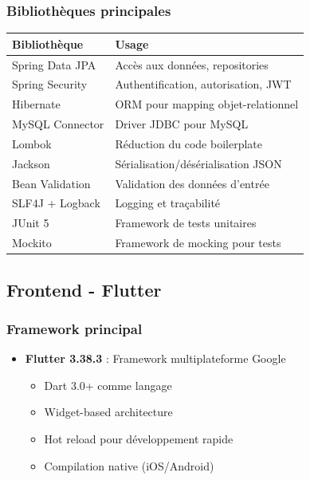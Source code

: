 \documentclass[a4paper,11pt]{report}
\begin{document}
\subsubsection{Bibliothèques principales}

\begin{longtable}{|p{}|p{}|}
    \hline
    \textbf{Bibliothèque} & \textbf{Usage} \\ \hline
    \endhead
    
    Spring Data JPA & Accès aux données, repositories \\ \hline
    Spring Security & Authentification, autorisation, JWT \\ \hline
    Hibernate & ORM pour mapping objet-relationnel \\ \hline
    MySQL Connector & Driver JDBC pour MySQL \\ \hline
    Lombok & Réduction du code boilerplate \\ \hline
    Jackson & Sérialisation/désérialisation JSON \\ \hline
    Bean Validation & Validation des données d'entrée \\ \hline
    SLF4J + Logback & Logging et traçabilité \\ \hline
    JUnit 5 & Framework de tests unitaires \\ \hline
    Mockito & Framework de mocking pour tests \\ \hline
\end{longtable}

\subsection{Frontend - Flutter}

\subsubsection{Framework principal}

\begin{itemize}
    \item \textbf{Flutter 3.38.3} : Framework multiplateforme Google
    \begin{itemize}
        \item Dart 3.0+ comme langage
        \item Widget-based architecture
        \item Hot reload pour développement rapide
        \item Compilation native (iOS/Android)
    \end{itemize}
\end{itemize}
\end{document}
